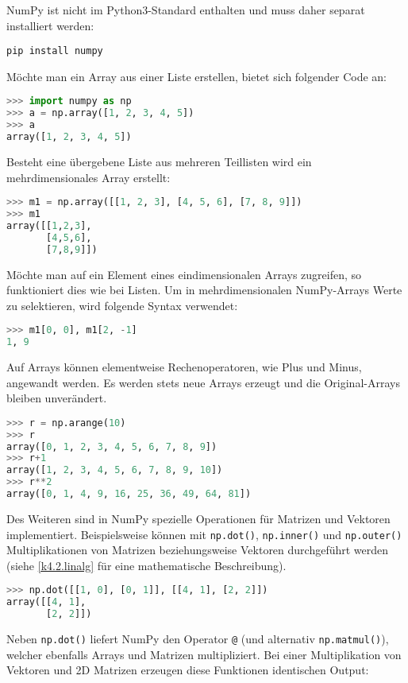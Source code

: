 NumPy ist nicht im Python3-Standard enthalten und muss daher separat installiert werden:
\begin{lstlisting}
pip install numpy
\end{lstlisting}
Möchte man ein Array aus einer Liste erstellen, bietet sich folgender Code an:
\begin{lstlisting}[language=python]
>>> import numpy as np
>>> a = np.array([1, 2, 3, 4, 5])
>>> a
array([1, 2, 3, 4, 5])
\end{lstlisting}
Besteht eine übergebene Liste aus mehreren Teillisten wird ein mehrdimensionales Array erstellt:
\begin{lstlisting}[language=python]
>>> m1 = np.array([[1, 2, 3], [4, 5, 6], [7, 8, 9]])
>>> m1
array([[1,2,3],
       [4,5,6],
       [7,8,9]])
\end{lstlisting}
Möchte man auf ein Element eines eindimensionalen Arrays zugreifen, so funktioniert dies wie bei Listen. Um in mehrdimensionalen NumPy-Arrays Werte zu selektieren, wird folgende Syntax verwendet:
\begin{lstlisting}[language=python]
>>> m1[0, 0], m1[2, -1]
1, 9
\end{lstlisting}
Auf Arrays können elementweise Rechenoperatoren, wie Plus und Minus, angewandt werden. Es werden stets neue Arrays erzeugt und die Original-Arrays bleiben unverändert.
\begin{lstlisting}[language=python]
>>> r = np.arange(10)
>>> r
array([0, 1, 2, 3, 4, 5, 6, 7, 8, 9])
>>> r+1
array([1, 2, 3, 4, 5, 6, 7, 8, 9, 10])
>>> r**2
array([0, 1, 4, 9, 16, 25, 36, 49, 64, 81])
\end{lstlisting}
Des Weiteren sind in NumPy spezielle Operationen für Matrizen und Vektoren implementiert. Beispielsweise können mit \verb|np.dot()|, \verb|np.inner()| und \verb|np.outer()| Multiplikationen von Matrizen beziehungsweise Vektoren durchgeführt werden (siehe \cref{k4.2.linalg} für eine mathematische Beschreibung).
\begin{lstlisting}[language=python]
>>> np.dot([[1, 0], [0, 1]], [[4, 1], [2, 2]])
array([[4, 1],
       [2, 2]])
\end{lstlisting}
Neben \verb|np.dot()| liefert NumPy den Operator \verb|@| (und alternativ \verb|np.matmul()|), welcher ebenfalls Arrays und Matrizen multipliziert.
Bei einer Multiplikation von Vektoren und 2D Matrizen erzeugen diese Funktionen identischen Output:
